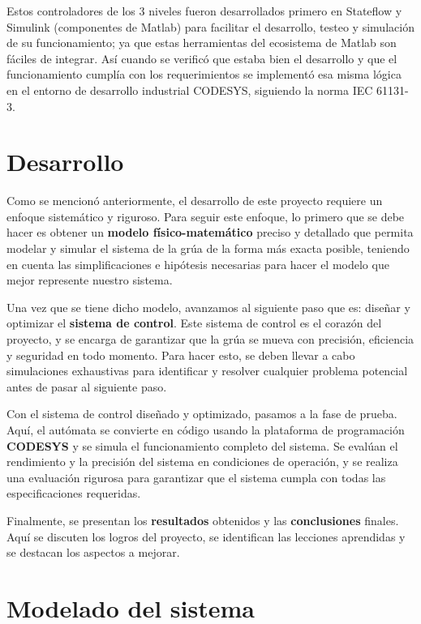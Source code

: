 \documentclass[11pt]{article}
\begin{document}
\par
Estos controladores de los 3 niveles fueron desarrollados primero en Stateflow y Simulink (componentes de Matlab) para facilitar el desarrollo, testeo y simulación de su funcionamiento; ya que estas herramientas del ecosistema de Matlab son fáciles de integrar. Así cuando se verificó que estaba bien el desarrollo y que el funcionamiento cumplía con los requerimientos se implementó esa misma lógica en el entorno de desarrollo industrial CODESYS, siguiendo la norma IEC 61131-3.


\newpage


\section{Desarrollo}
Como se mencionó anteriormente, el desarrollo de este proyecto requiere un enfoque sistemático y riguroso. Para seguir este enfoque, lo primero que se debe hacer es obtener un \textbf{modelo físico-matemático} preciso y detallado que permita modelar y simular el sistema de la grúa de la forma más exacta posible, teniendo en cuenta las simplificaciones e hipótesis necesarias para hacer el modelo que mejor represente nuestro sistema.
\par
Una vez que se tiene dicho modelo, avanzamos al siguiente paso que es: diseñar y optimizar el \textbf{sistema de control}. Este sistema de control es el corazón del proyecto, y se encarga de garantizar que la grúa se mueva con precisión, eficiencia y seguridad en todo momento. Para hacer esto, se deben llevar a cabo simulaciones exhaustivas para identificar y resolver cualquier problema potencial antes de pasar al siguiente paso.
\par
Con el sistema de control diseñado y optimizado, pasamos a la fase de prueba. Aquí, el autómata se convierte en código usando la plataforma de programación \textbf{CODESYS} y se simula el funcionamiento completo del sistema. Se evalúan el rendimiento y la precisión del sistema en condiciones de operación, y se realiza una evaluación rigurosa para garantizar que el sistema cumpla con todas las especificaciones requeridas.
\par
Finalmente, se presentan los \textbf{resultados} obtenidos y las \textbf{conclusiones} finales. Aquí se discuten los logros del proyecto, se identifican las lecciones aprendidas y se destacan los aspectos a mejorar.

\section{Modelado del sistema}
\end{document}
